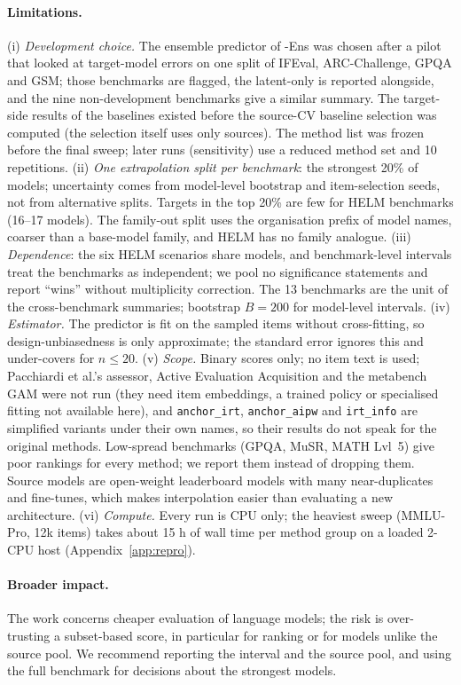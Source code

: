 \paragraph{Limitations.}
(i) \emph{Development choice.} The ensemble predictor of \mass{}-Ens was chosen after a pilot that looked at target-model errors on one split of IFEval, ARC-Challenge, GPQA and GSM; those benchmarks are flagged, the latent-only \mass{} is reported alongside, and the nine non-development benchmarks give a similar summary. The target-side results of the baselines existed before the source-CV baseline selection was computed (the selection itself uses only sources). The method list was frozen before the final sweep; later runs (sensitivity) use a reduced method set and 10 repetitions.
(ii) \emph{One extrapolation split per benchmark}: the strongest 20\% of models; uncertainty comes from model-level bootstrap and item-selection seeds, not from alternative splits. Targets in the top 20\% are few for HELM benchmarks (16--17 models). The family-out split uses the organisation prefix of model names, coarser than a base-model family, and HELM has no family analogue.
(iii) \emph{Dependence}: the six HELM scenarios share models, and benchmark-level intervals treat the benchmarks as independent; we pool no significance statements and report ``wins'' without multiplicity correction. The 13 benchmarks are the unit of the cross-benchmark summaries; bootstrap $B=200$ for model-level intervals.
(iv) \emph{Estimator.} The predictor is fit on the sampled items without cross-fitting, so design-unbiasedness is only approximate; the standard error ignores this and under-covers for $n\le 20$.
(v) \emph{Scope.} Binary scores only; no item text is used; Pacchiardi et al.'s assessor, Active Evaluation Acquisition and the metabench GAM were not run (they need item embeddings, a trained policy or specialised fitting not available here), and \texttt{anchor\_irt}, \texttt{anchor\_aipw} and \texttt{irt\_info} are simplified variants under their own names, so their results do not speak for the original methods. Low-spread benchmarks (GPQA, MuSR, MATH Lvl~5) give poor rankings for every method; we report them instead of dropping them. Source models are open-weight leaderboard models with many near-duplicates and fine-tunes, which makes interpolation easier than evaluating a new architecture.
(vi) \emph{Compute.} Every run is CPU only; the heaviest sweep (MMLU-Pro, 12k items) takes about 15 h of wall time per method group on a loaded 2-CPU host (Appendix~\ref{app:repro}).

\paragraph{Broader impact.}
The work concerns cheaper evaluation of language models; the risk is over-trusting a subset-based score, in particular for ranking or for models unlike the source pool. We recommend reporting the interval and the source pool, and using the full benchmark for decisions about the strongest models.
